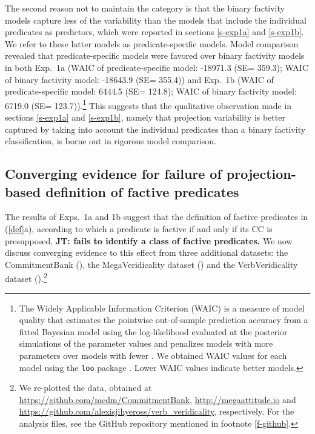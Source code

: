 \documentclass[11pt,fleqn]{article}
\newcommand{\6}{\mbox{$[\hspace*{-.6mm}[$}}
\newcommand{\9}{\mbox{$]\hspace*{-.6mm}]$}}
\newcommand{\jt}[1]{\textbf{\color{blue}JT: #1}}
\begin{document}
The second reason not to maintain the category is that the binary factivity models capture less of the variability than the models that include the individual predicates as predictors, which were reported in sections \ref{s-exp1a} and \ref{s-exp1b}. We refer to these latter models as predicate-specific models. Model comparison revealed that predicate-specific models were favored over binary factivity models in both Exp.~1a (WAIC of predicate-specific model: -18971.3 (SE= 359.3); WAIC of binary factivity model: -18643.9 (SE= 355.4))  and Exp.~1b (WAIC of predicate-specific model: 6444.5 (SE= 124.8); WAIC of binary factivity model: 6719.0 (SE= 123.7)).\footnote{The Widely Applicable Information Criterion (WAIC) is a measure of model quality that estimates the pointwise out-of-sample prediction accuracy from a fitted Bayesian model using the log-likelihood evaluated at the posterior simulations of the parameter values and penalizes models with more parameters over models with fewer \citep{watanabe2010}. We obtained WAIC values for each model using the \texttt{loo} package \citep{vehtari2017}. Lower WAIC values indicate better models.} This suggests that the qualitative observation made in sections  \ref{s-exp1a} and \ref{s-exp1b}, namely that projection variability is better captured by taking into account the individual predicates than a binary factivity classification, is borne out in rigorous model comparison. 

\subsection{Converging evidence for failure of projection-based definition of factive predicates}\label{s-converging1}

The results of  Exps.~1a and 1b suggest that the definition of factive predicates in (\ref{def}a), according to which a predicate is factive if and only if its CC is presupposed, \jt{fails to identify a class of factive predicates.} We now discuss converging evidence to this effect from three additional datasets: the CommitmentBank (\citealt*{demarneffe-etal-sub23}), the MegaVeridicality dataset (\citealt{white-rawlins-nels2018,white-etal2018b}) and the VerbVeridicality dataset (\citealt{ross-pavlick2019}).\footnote{We re-plotted the data, obtained at \url{https://github.com/mcdm/CommitmentBank}, \url{http://megaattitude.io} and \url{https://github.com/alexisjihyeross/verb_veridicality}, respectively. For the analysis files, see the GitHub repository mentioned in footnote \ref{f-github}.}
\end{document}
